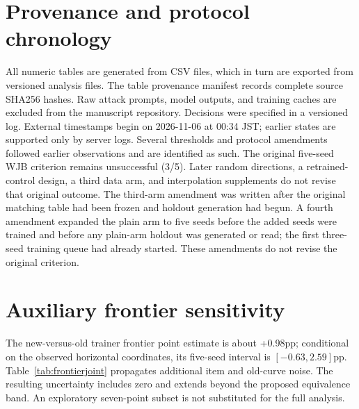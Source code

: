 \documentclass[11pt]{article}
\begin{document}
\section{Provenance and protocol chronology}
All numeric tables are generated from CSV files, which in turn are exported from versioned analysis files. The table provenance manifest records complete source SHA256 hashes. Raw attack prompts, model outputs, and training caches are excluded from the manuscript repository. Decisions were specified in a versioned log. External timestamps begin on 2026-11-06 at 00:34 JST; earlier states are supported only by server logs. Several thresholds and protocol amendments followed earlier observations and are identified as such.
The original five-seed WJB criterion remains unsuccessful (3/5). Later random directions, a retrained-control design, a third data arm, and interpolation supplements do not revise that original outcome. The third-arm amendment was written after the original matching table had been frozen and holdout generation had begun. A fourth amendment expanded the plain arm to five seeds before the added seeds were trained and before any plain-arm holdout was generated or read; the first three-seed training queue had already started. These amendments do not revise the original criterion.
\section{Auxiliary frontier sensitivity}
The new-versus-old trainer frontier point estimate is about +0.98pp; conditional on the observed horizontal coordinates, its five-seed interval is $[-0.63,2.59]$pp. Table~\ref{tab:frontierjoint} propagates additional item and old-curve noise. The resulting uncertainty includes zero and extends beyond the proposed equivalence band. An exploratory seven-point subset is not substituted for the full analysis.

\end{document}
